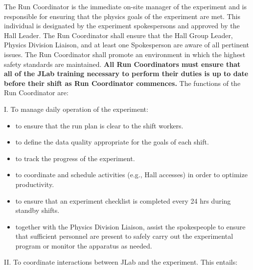 \documentclass[10pt]{article}
\begin{document}
 The Run Coordinator is the  immediate on-site manager of the experiment
and is responsible for ensuring that the physics goals of the experiment
are met. This individual is designated by the experiment spokespersons
and approved by the Hall Leader.  The Run Coordinator shall ensure that
the Hall Group Leader, Physics Division Liaison, and at least
one Spokesperson are aware of all pertinent issues. The Run Coordinator
shall promote an environment in which the highest safety
standards are maintained.
{\bf All Run Coordinators must ensure that all of the JLab training necessary to perform
their duties is up to date before their shift as Run Coordinator commences.}
The functions of the Run Coordinator  are:

\noindent I. To manage daily operation of the experiment:

\begin{itemize}

\item to ensure that the run plan is clear to the shift workers.

\item to define the data quality appropriate for the goals of each shift.

\item to track the progress of the experiment.

\item to coordinate and schedule activities (e.g.,
Hall accesses) in order to optimize productivity.

\item to ensure that an experiment checklist is completed every 24 hrs during
standby shifts.

\item together with the Physics Division Liaison,
assist the spokespeople to ensure that
sufficient personnel are present to safely carry out the experimental
program or monitor the apparatus as needed.

\end{itemize}


\vspace{.25cm}

\noindent II. To coordinate interactions between JLab and the experiment. This
 entails:
\end{document}

